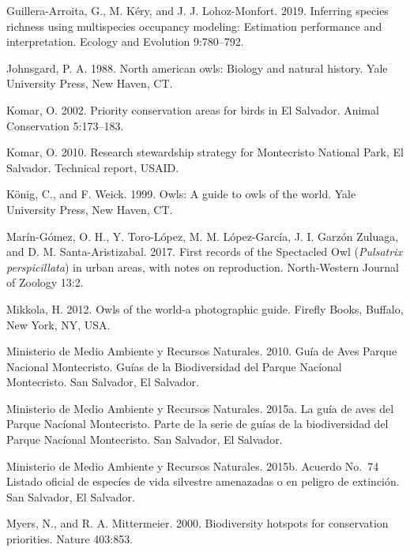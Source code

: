 \documentclass[
]{article}
\begin{document}
\leavevmode\hypertarget{ref-Guillera-Arroita:2019}{}%
Guillera-Arroita, G., M. Kéry, and J. J. Lohoz-Monfort. 2019. Inferring
species richness using multispecies occupancy modeling: Estimation
performance and interpretation. Ecology and Evolution 9:780--792.

\leavevmode\hypertarget{ref-Johnsgard:1988}{}%
Johnsgard, P. A. 1988. North american owls: Biology and natural history.
Yale University Press, New Haven, CT.

\leavevmode\hypertarget{ref-Komar:2002}{}%
Komar, O. 2002. Priority conservation areas for birds in El Salvador.
Animal Conservation 5:173--183.

\leavevmode\hypertarget{ref-Komar:2010}{}%
Komar, O. 2010. Research stewardship strategy for Montecristo National
Park, El Salvador. Technical report, USAID.

\leavevmode\hypertarget{ref-Konig:1999}{}%
König, C., and F. Weick. 1999. Owls: A guide to owls of the world. Yale
University Press, New Haven, CT.

\leavevmode\hypertarget{ref-Marin-Gomez:2017}{}%
Marín-Gómez, O. H., Y. Toro-López, M. M. López-García, J. I. Garzón
Zuluaga, and D. M. Santa-Aristizabal. 2017. First records of the
Spectacled Owl (\emph{Pulsatrix perspicillata}) in urban areas, with
notes on reproduction. North-Western Journal of Zoology 13:2.

\leavevmode\hypertarget{ref-Mikkola:2012}{}%
Mikkola, H. 2012. Owls of the world-a photographic guide. Firefly Books,
Buffalo, New York, NY, USA.

\leavevmode\hypertarget{ref-MARN:2010}{}%
Ministerio de Medio Ambiente y Recursos Naturales. 2010. Guía de Aves
Parque Nacional Montecristo. Guías de la Biodiversidad del Parque
Nacíonal Montecristo. San Salvador, El Salvador.

\leavevmode\hypertarget{ref-MARN:2015b}{}%
Ministerio de Medio Ambiente y Recursos Naturales. 2015a. La guía de
aves del Parque Nacíonal Montecristo. Parte de la serie de guías de la
biodiversidad del Parque Nacíonal Montecristo. San Salvador, El
Salvador.

\leavevmode\hypertarget{ref-MARN:2015}{}%
Ministerio de Medio Ambiente y Recursos Naturales. 2015b. Acuerdo No.~74
Listado oficial de especíes de vida silvestre amenazadas o en peligro de
extinción. San Salvador, El Salvador.

\leavevmode\hypertarget{ref-Myers:2000}{}%
Myers, N., and R. A. Mittermeier. 2000. Biodiversity hotspots for
conservation priorities. Nature 403:853.
\end{document}
